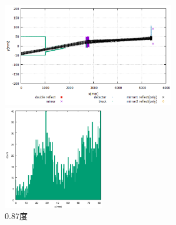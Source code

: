 \begin{figure}[H]
\begin{minipage}{0.50\hsize}
\begin{center}
\includegraphics[height=4.5cm]{angle/polonesim.png}
\end{center}
\end{minipage}
\begin{minipage}{0.50\hsize}
\begin{center}
\includegraphics[height=4.5cm]{angle/poloneex.png}
\end{center}
\end{minipage}
\caption{0.87度}
\end{figure}

